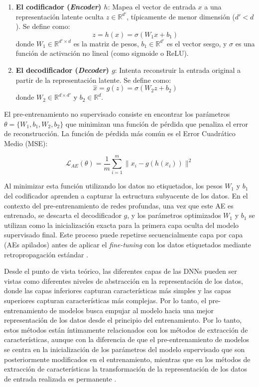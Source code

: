 \begin{enumerate}
    \item \textbf{El codificador (\textit{Encoder}) $h$}: Mapea el vector de entrada $x$ a una representación latente oculta $z \in \mathbb{R}^{d'}$, típicamente de menor dimensión ($d' < d$). Se define como:
    \begin{equation}
        z = h(x) = \sigma(W_1 x + b_1)
    \end{equation}
    donde $W_1 \in \mathbb{R}^{d' \times d}$ es la matriz de pesos, $b_1 \in \mathbb{R}^{d'}$ es el vector sesgo, y $\sigma$ es una función de activación no lineal (como sigmoide o ReLU).
    
    \item \textbf{El decodificador (\textit{Decoder}) $g$}: Intenta reconstruir la entrada original a partir de la representación latente. Se define como:
    \begin{equation}
        \hat{x} = g(z) = \sigma(W_2 z + b_2)
    \end{equation}
    donde $W_2 \in \mathbb{R}^{d \times d'}$ y $b_2 \in \mathbb{R}^d$.
\end{enumerate}

El pre-entrenamiento no supervisado consiste en encontrar los parámetros $\theta = \{W_1, b_1, W_2, b_2\}$ que minimizan una función de pérdida que penaliza el error de reconstrucción. La función de pérdida más común es el Error Cuadrático Medio (MSE):

\begin{equation}
    \mathcal{L}_{AE}(\theta) = \frac{1}{m} \sum_{i=1}^{m} \|x_i - g(h(x_i))\|^2
\end{equation}

Al minimizar esta función utilizando los datos no etiquetados, los pesos $W_1$ y $b_1$ del codificador aprenden a capturar la estructura subyacente de los datos. En el contexto del pre-entrenamiento de redes profundas, una vez que este \gls{AE} es entrenado, se descarta el decodificador $g$, y los parámetros optimizados $W_1$ y $b_1$ se utilizan como la inicialización exacta para la primera capa oculta del modelo supervisado final. Este proceso puede repetirse secuencialmente capa por capa (\glspl{AE} apilados) antes de aplicar el \textit{fine-tuning} con los datos etiquetados mediante retropropagación estándar \cite{vincent2008extracting}.

Desde el punto de vista teórico, las diferentes capas de las \glspl{DNN} pueden ser vistas como diferentes niveles de abstracción en la representación de los datos, donde las capas inferiores capturan características más simples y las capas superiores capturan características más complejas. Por lo tanto, el pre-entrenamiento de modelos busca empujar al modelo hacia una mejor representación de los datos desde el principio del entrenamiento. Por lo tanto, estos métodos están íntimamente relacionados con los métodos de extracción de características, aunque con la diferencia de que el pre-entrenamiento de modelos se centra en la inicialización de los parámetros del modelo supervisado que son posteriormente modificados en el entrenamiento, mientras que en los métodos de extracción de características la transformación de la representación de los datos de entrada realizada es permanente \cite{van2020survey}. 
